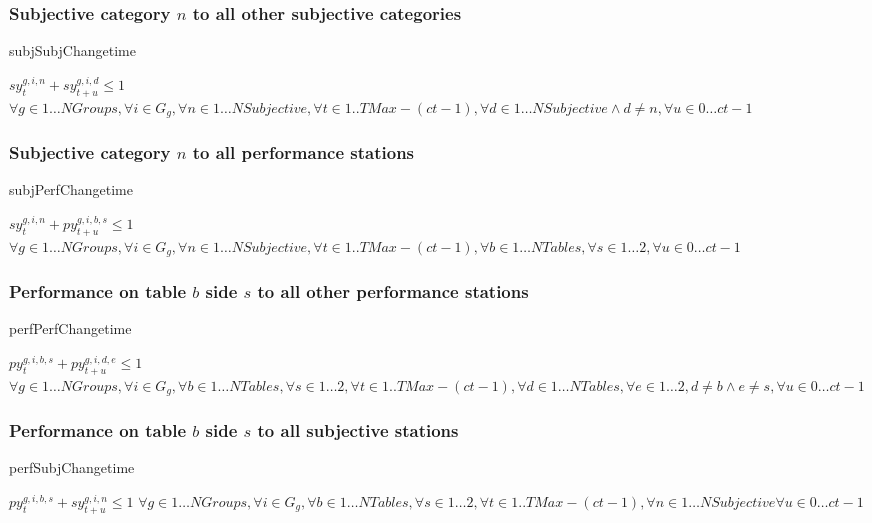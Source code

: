 \documentclass[letterpaper,11pt]{report}
\begin{document}
\FloatBarrier
\subsubsection{Subjective category $n$ to all other subjective categories}
\begin{algorithm}
\caption{subjSubjChangetime}
$sy_{t}^{g,i,n} + sy_{t+u}^{g,i,d} \le 1$
\hfill $
\forall g \in 1 \dots NGroups,
\forall i \in G_{g},
\forall n \in 1 \dots NSubjective, 
\forall t \in 1..{TMax- (ct-1)},
\forall d \in 1 \dots NSubjective \wedge d \neq n,
\forall u \in 0 \dots ct-1$
\end{algorithm}

\FloatBarrier
\subsubsection{Subjective category $n$ to all performance stations}
\begin{algorithm}
\caption{subjPerfChangetime}
$sy_{t}^{g,i,n} + py_{t+u}^{g,i,b,s} \le 1$
\hfill $
\forall g \in 1 \dots NGroups,
\forall i \in G_{g},
\forall n \in 1 \dots NSubjective, 
\forall t \in 1..{TMax- (ct-1)},
\forall b \in 1 \dots NTables,
\forall s \in 1 \dots 2,
\forall u \in 0 \dots ct-1
$
\end{algorithm}

\FloatBarrier
\subsubsection{Performance on table $b$ side $s$ to all other performance
  stations}
\begin{algorithm}
\caption{perfPerfChangetime}
$py_{t}^{g,i,b,s} + py_{t+u}^{g,i,d,e} \le 1$
\hfill $
\forall g \in 1 \dots NGroups,
\forall i \in G_{g},
\forall b \in 1 \dots NTables,
\forall s \in 1 \dots 2,
\forall t \in 1..{TMax- (ct-1)},
\forall d \in 1 \dots NTables ,
\forall e \in 1 \dots 2,
d \neq b  \wedge e \neq s,
\forall u \in 0 \dots ct-1$
\end{algorithm}

\FloatBarrier
\subsubsection{Performance on table $b$ side $s$ to all subjective
  stations}
\begin{algorithm}
\caption{perfSubjChangetime}
$py_{t}^{g,i,b,s} + sy_{t+u}^{g,i,n} \le 1$
\hfill $
\forall g \in 1 \dots NGroups,
\forall i \in G_{g},
\forall b \in 1 \dots NTables,
\forall s \in 1 \dots 2,
\forall t \in 1..{TMax-(ct-1)},
\forall n \in 1 \dots NSubjective
\forall u \in 0 \dots ct-1$
\end{algorithm}
\end{document}
